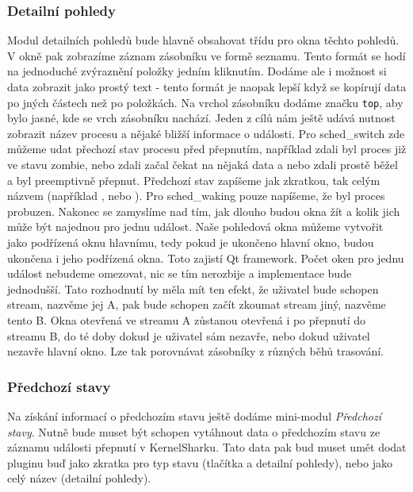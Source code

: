 \subsubsection{Detailní pohledy}
Modul detailních pohledů bude hlavně obsahovat třídu pro okna těchto pohledů. V okně pak zobrazíme záznam zásobníku ve formě seznamu. Tento formát se hodí na jednoduché zvýraznění položky jedním kliknutím. Dodáme ale i možnost si data zobrazit jako prostý text - tento formát je naopak lepší když se kopírují data po jných částech než po položkách. Na vrchol zásobníku dodáme značku \texttt{top}, aby bylo jasné, kde se vrch zásobníku nachází. Jeden z cílů nám ještě udává nutnost zobrazit název procesu a nějaké bližší informace o události. Pro sched\_switch zde můžeme udat přechozí stav procesu před přepnutím, například zdali byl proces již ve stavu zombie, nebo zdali začal čekat na nějaká data a nebo zdali prostě běžel a byl preemptivně přepnut. Předchozí stav zapíšeme jak zkratkou, tak celým názvem (například , nebo ). Pro sched\_waking pouze napíšeme, že byl proces probuzen. Nakonec se zamyslíme nad tím, jak dlouho budou okna žít a kolik jich může být najednou pro jednu událost. Naše pohledová okna můžeme vytvořit jako podřízená oknu hlavnímu, tedy pokud je ukončeno hlavní okno, budou ukončena i jeho podřízená okna. Toto zajistí Qt framework. Počet oken pro jednu událost nebudeme omezovat, nic se tím nerozbije a implementace bude jednodušší. Tato rozhodnutí by měla mít ten efekt, že uživatel bude schopen stream, nazvěme jej A, pak bude schopen začít zkoumat stream jiný, nazvěme tento B. Okna otevřená ve streamu A zůstanou otevřená i po přepnutí do streamu B, do té doby dokud je uživatel sám nezavře, nebo dokud uživatel nezavře hlavní okno. Lze tak porovnávat zásobníky z různých běhů trasování.

\subsubsection{Předchozí stavy}
Na získání informací o předchozím stavu ještě dodáme mini-modul \emph{Předchozí stavy}. Nutně bude muset být schopen vytáhnout data o předchozím stavu ze záznamu události přepnutí v KernelSharku. Tato data pak bud muset umět dodat pluginu buď jako zkratka pro typ stavu (tlačítka a detailní pohledy), nebo jako celý název (detailní pohledy).

